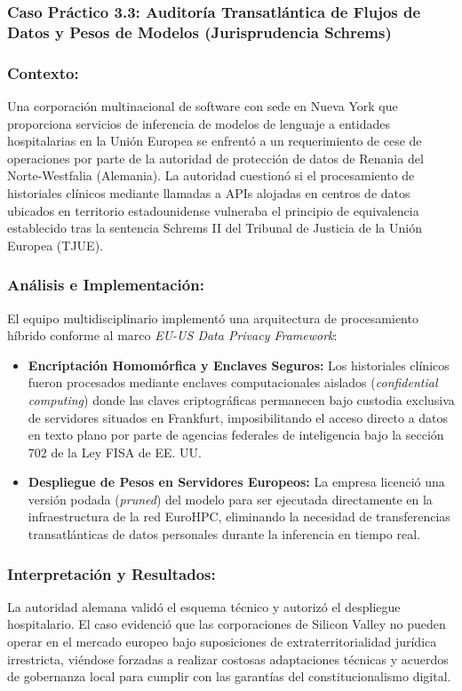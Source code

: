 \subsubsection{Caso Práctico 3.3: Auditoría Transatlántica de Flujos de Datos y Pesos de Modelos (Jurisprudencia Schrems)}

\subsubsection*{Contexto:}
Una corporación multinacional de software con sede en Nueva York que proporciona servicios de inferencia de modelos de lenguaje a entidades hospitalarias en la Unión Europea se enfrentó a un requerimiento de cese de operaciones por parte de la autoridad de protección de datos de Renania del Norte-Westfalia (Alemania). La autoridad cuestionó si el procesamiento de historiales clínicos mediante llamadas a APIs alojadas en centros de datos ubicados en territorio estadounidense vulneraba el principio de equivalencia establecido tras la sentencia Schrems II del Tribunal de Justicia de la Unión Europea (TJUE).

\subsubsection*{Análisis e Implementación:}
El equipo multidisciplinario implementó una arquitectura de procesamiento híbrido conforme al marco \textit{EU-US Data Privacy Framework}:
\begin{itemize}[leftmargin=2em]
    \item \textbf{Encriptación Homomórfica y Enclaves Seguros:} Los historiales clínicos fueron procesados mediante enclaves computacionales aislados (\textit{confidential computing}) donde las claves criptográficas permanecen bajo custodia exclusiva de servidores situados en Frankfurt, imposibilitando el acceso directo a datos en texto plano por parte de agencias federales de inteligencia bajo la sección 702 de la Ley FISA de EE. UU.
    \item \textbf{Despliegue de Pesos en Servidores Europeos:} La empresa licenció una versión podada (\textit{pruned}) del modelo para ser ejecutada directamente en la infraestructura de la red EuroHPC, eliminando la necesidad de transferencias transatlánticas de datos personales durante la inferencia en tiempo real.
\end{itemize}

\subsubsection*{Interpretación y Resultados:}
La autoridad alemana validó el esquema técnico y autorizó el despliegue hospitalario. El caso evidenció que las corporaciones de Silicon Valley no pueden operar en el mercado europeo bajo suposiciones de extraterritorialidad jurídica irrestricta, viéndose forzadas a realizar costosas adaptaciones técnicas y acuerdos de gobernanza local para cumplir con las garantías del constitucionalismo digital.


